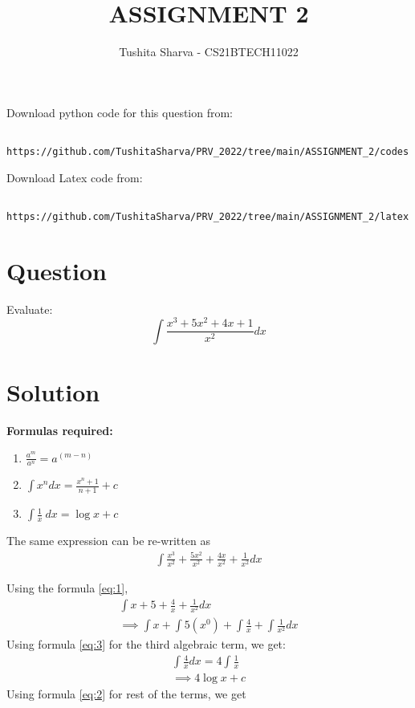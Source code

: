 \documentclass[journal,12pt,twocolumn]{IEEEtran}
\title{ASSIGNMENT 2}
\author{Tushita Sharva - CS21BTECH11022}
\numberwithin{equation}{subsection}
\begin{document}
\providecommand{\brak}[1]{\ensuremath{\left(#1\right)}}
\renewcommand\thesection{\arabic{section}}
\renewcommand\thesubsection{\thesection.\arabic{subsection}}
\renewcommand\thesubsubsection{\thesubsection.\arabic{subsubsection}}
\newcommand{\question}{\noindent \textbf{Question: }}
\newcommand{\solution}{\noindent \textbf{Solution: }}
\newcommand{\formulas}{\noindent \textbf{Formulas required:}}
\newcommand{\answer}{\noindent \textbf{Final Answer:}}

\maketitle

Download python code for this question from:

\begin{lstlisting}
  https://github.com/TushitaSharva/PRV_2022/tree/main/ASSIGNMENT_2/codes
\end{lstlisting}

Download Latex code from: 
\begin{lstlisting}
    https://github.com/TushitaSharva/PRV_2022/tree/main/ASSIGNMENT_2/latex
\end{lstlisting}


\section{Question}
Evaluate: $$\int \frac{x^3 + 5x^2 + 4x + 1}{x^2} dx$$

\section{Solution}

\formulas
\begin{enumerate}
    \item $ \frac{a^m}{a^n} = a^\brak{m-n}$ \label{eq:1}
    \item $\int x^n dx = \frac{x^n+1}{n+1} + c$ \label{eq:2}
    \item $\int \frac{1}{x}\ dx = \log x + c$ \label{eq:3}
\end{enumerate}


The same expression can be re-written as 
\begin{align}
    \int \frac{x^3}{x^2} + \frac{5x^2}{x^2} + \frac{4x}{x^2} + \frac{1}{x^2} dx
\end{align}


Using the formula \eqref{eq:1}, 
\begin{align}
    \int x + 5 + \frac{4}{x} + \frac{1}{x^2} dx\\
    \implies \int x + \int 5\brak{x^0} + \int \frac{4}{x} + \int \frac{1}{x^2} dx
\end{align}
Using formula \eqref{eq:3} for the third algebraic term, we get: 
\begin{align}
    \int \frac{4}{x} dx = 4 \int \frac{1}{x}\\
    \implies 4\log x + c
\end{align}
Using formula \eqref{eq:2} for rest of the terms, we get
\end{document}
